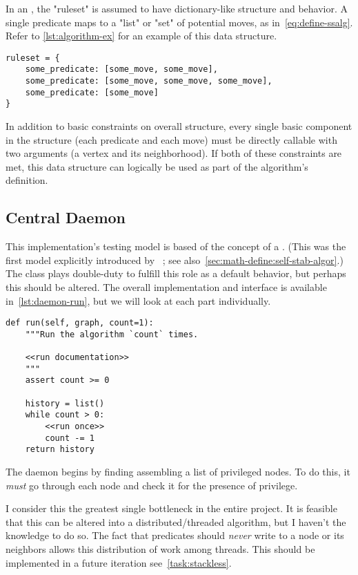 In an , the "ruleset" is assumed to have
  dictionary-like structure and behavior.
A single predicate maps to a "list" or "set" of potential moves, as in~\autoref{eq:define-ssalg}.
Refer to \autoref{lst:algorithm-ex} for an example of this data structure.
\begin{lstlisting}[float, caption={An example structure to use as an \object{Algorithm}'s \texttt{\small ruleset}}, label={lst:algorithm-ex}]
ruleset = {
    some_predicate: [some_move, some_move],
    some_predicate: [some_move, some_move, some_move],
    some_predicate: [some_move]
}
\end{lstlisting}
In addition to basic constraints on overall structure,
  every single basic component in the structure
  (each predicate and each move)
  must be directly callable with two arguments (a vertex and its neighborhood).
If both of these constraints are met, this data structure can logically be used as part of the algorithm's definition.

\subsection{Central Daemon}
\label{sec:logic-repr:daemon}

This implementation's testing model is based of the concept of a .
(This was the first model explicitly introduced
  by \citeauthor{dew:sem}~\autocite{dew:sem}; see also~\autoref{sec:math-define:self-stab-algor}.)
The  class plays double-duty to fulfill this role as a default behavior,
  but perhaps this should be altered.
The overall implementation and interface is available in~\autoref{lst:daemon-run},
  but we will look at each part individually.

\begin{lstlisting}[float=p, caption={A generalized run of a self-stabilizing algorithm.}, label={lst:daemon-run}]
def run(self, graph, count=1):
    """Run the algorithm `count` times.

    <<run documentation>>
    """
    assert count >= 0

    history = list()
    while count > 0:
        <<run once>>
        count -= 1
    return history
\end{lstlisting}

The daemon begins by finding assembling a list of privileged nodes.
To do this, it \emph{must} go through each node and check it for the presence of privilege.
\begin{warning}
  I consider this the greatest single bottleneck in the entire project.
  It is feasible that this can be altered into a distributed\slash threaded algorithm,
    but I haven't the knowledge to do so.
  The fact that predicates should \emph{never} write to a node or its neighbors
    allows this distribution of work among threads.
  This should be implemented in a future iteration \Dash see~\autoref{task:stackless}.
\end{warning}

